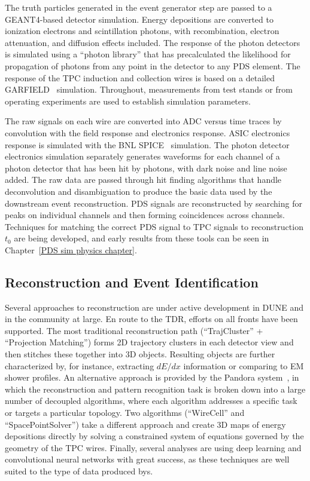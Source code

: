 The truth particles generated in the event generator step are passed to a {\sc GEANT4}-based detector simulation.  Energy depositions are converted to ionization electrons and scintillation photons, with recombination, electron attenuation, and diffusion effects included.  The response of the photon detectors is simulated using a ``photon library'' that has precalculated the likelihood for propagation of photons from any point in the detector to any PDS element.  The response of the TPC induction and collection wires is based on a detailed GARFIELD~\cite{garfield} simulation.  Throughout, measurements from test stands or from operating \lartpc experiments are used to establish simulation parameters.

The raw signals on each wire are converted into ADC versus time traces by convolution with the field response and electronics response.  ASIC electronics response is simulated with the BNL SPICE~\cite{spice} simulation.  The photon detector electronics simulation separately generates waveforms for each channel of a photon detector that has been hit by photons, with dark noise and line noise added.  The raw data are passed through hit finding algorithms that handle deconvolution and disambiguation to produce the basic data used by the downstream event reconstruction. PDS signals are reconstructed by searching for peaks on individual channels and then forming coincidences across channels. Techniques for matching the correct PDS signal to TPC signals to reconstruction $t_0$ are being developed, and early results from these tools can be seen in Chapter~\ref{PDS sim physics chapter}.

\subsection{Reconstruction and Event Identification}
Several approaches to \lartpc reconstruction are under active development in DUNE and in the community at large.  En route to the TDR, efforts on all fronts have been supported.  The most traditional reconstruction path (``TrajCluster'' + ``Projection Matching'') forms 2D trajectory clusters in each detector view and then stitches these together into 3D objects.  Resulting objects are further characterized by, for instance, extracting $dE/dx$ information or comparing to EM shower profiles.  An alternative approach is provided by the Pandora system~\cite{Marshall:2015rfa}, in which the reconstruction and pattern recognition task is broken down into a large number of decoupled algorithms, where each algorithm addresses a specific task or targets a particular topology.  Two algorithms (``WireCell'' and ``SpacePointSolver'') take a different approach and create 3D maps of energy depositions directly by solving a constrained system of equations governed by the geometry of the TPC wires.  Finally, several analyses are using deep learning and convolutional neural networks with great success, as these techniques are well suited to the type of data produced by\lartpc{}s.

